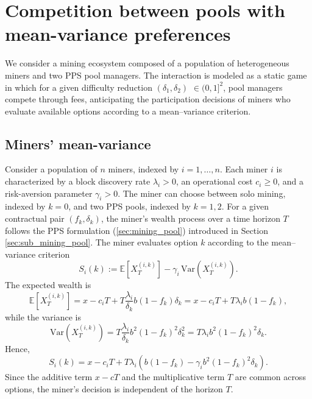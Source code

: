 \section{Competition between pools with mean-variance preferences}

We consider a mining ecosystem composed of a population of heterogeneous miners and two PPS pool managers. The interaction is modeled as a static game in which for a given difficulty reduction $(\delta_1,\delta_2)$ $\in(0,1]^2$, pool managers compete through fees, anticipating the participation decisions of miners who evaluate available options according to a mean--variance criterion.

\subsection{Miners' mean-variance}

Consider a population of $n$ miners, indexed by $i = 1, \dots, n$. Each miner $i$ 
is characterized by a block discovery rate $\lambda_i > 0$, an operational cost 
$c_i \geq 0$, and a risk-aversion parameter $\gamma_i > 0$. The miner can choose between solo mining, indexed by $k=0$, and two PPS pools, indexed by $k=1,2$. For a given contractual pair $(f_k,\delta_k)$, the miner's wealth process over a time horizon $T$ follows the PPS formulation (\ref{sec:mining_pool}) introduced in Section \ref{sec:sub_mining_pool}. The miner evaluates option $k$ according to the mean--variance criterion
\begin{equation}
S_i(k)
:=
\mathbb{E}\!\left[X_T^{(i,k)}\right]
-
\gamma_i\,\mathrm{Var}\!\left(X_T^{(i,k)}\right).
\end{equation}
The expected wealth is
\begin{equation}
\mathbb{E}\!\left[X_T^{(i,k)}\right]
=
x-c_iT+T\frac{\lambda_i}{\delta_k}b(1-f_k)\delta_k
=
x-c_iT+T\lambda_i b(1-f_k),
\end{equation}
while the variance is
\begin{equation}
\mathrm{Var}\!\left(X_T^{(i,k)}\right)
=
T\frac{\lambda_i}{\delta_k}b^2(1-f_k)^2\delta_k^2
=
T\lambda_i b^2(1-f_k)^2\delta_k.
\end{equation}
Hence,
\begin{equation}
S_i(k)
=
x-c_iT
+
T\lambda_i
\left(
b(1-f_k)-\gamma_i b^2(1-f_k)^2\delta_k
\right).
\end{equation}
Since the additive term $x-cT$ and the multiplicative term $T$ are common across options, the miner's decision is independent of the horizon $T$.

